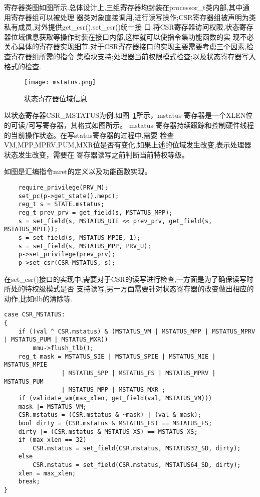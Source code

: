 寄存器类图如图所示.总体设计上,三组寄存器均封装在processor\_t类内部,其中通用寄存器组可以被处理
器类对象直接调用,进行读写操作;CSR寄存器组被声明为类私有成员,对外提供get\_csr(),set\_csr()统一接
口.将CSR寄存器访问权限,状态寄存器位域信息获取等操作封装在接口内部,这样就可以使指令集功能函数的实
现不必关心具体的寄存器实现细节.对于CSR寄存器接口的实现主要需要考虑三个因素,检查寄存器组所需的指令
集模块支持;处理器当前权限模式检查;以及状态寄存器写入格式的检查.
\begin{figure}[h]
    \centering
    \texttt{[image: mstatus.png]}
    \caption{状态寄存器位域信息}
    \label{fig:mstatus}
\end{figure}

以状态寄存器CSR\_MSTATUS为例.如图~\ref{fig:mstatus}所示，mstatus 寄存器是一个XLEN位的可读/可写寄存器，其格式如图所示。
mstatus 寄存器持续跟踪和控制硬件线程的当前操作状态。在写status寄存器的过程中,需要
检查VM,MPP,MPRV,PUM,MXR位是否有变化,如果上述的位域发生改变,表示处理器状态发生改变，需要在
寄存器读写之前判断当前特权等级。


如图是汇编指令mret的定义以及功能函数实现。
\begin{lstlisting}
    require_privilege(PRV_M);
    set_pc(p->get_state().mepc);
    reg_t s = STATE.mstatus;
    reg_t prev_prv = get_field(s, MSTATUS_MPP);
    s = set_field(s, MSTATUS_UIE << prev_prv, get_field(s, MSTATUS_MPIE));
    s = set_field(s, MSTATUS_MPIE, 1);
    s = set_field(s, MSTATUS_MPP, PRV_U);
    p->set_privilege(prev_prv);
    p->set_csr(CSR_MSTATUS, s);
\end{lstlisting}

在set\_csr()接口的实现中,需要对于CSR的读写进行检查,一方面是为了确保读写时所处的特权级模式是否
支持读写,另一方面需要针对状态寄存器的改变做出相应的动作,比如tlb的清除等.
\begin{lstlisting}
case CSR_MSTATUS:
{
    if ((val ^ CSR.mstatus) & (MSTATUS_VM | MSTATUS_MPP | MSTATUS_MPRV | MSTATUS_PUM | MSTATUS_MXR))
        mmu->flush_tlb();
    reg_t mask = MSTATUS_SIE | MSTATUS_SPIE | MSTATUS_MIE | MSTATUS_MPIE
                | MSTATUS_SPP | MSTATUS_FS | MSTATUS_MPRV | MSTATUS_PUM
                | MSTATUS_MPP | MSTATUS_MXR ;
    if (validate_vm(max_xlen, get_field(val, MSTATUS_VM)))
    mask |= MSTATUS_VM;
    CSR.mstatus = (CSR.mstatus & ~mask) | (val & mask);
    bool dirty = (CSR.mstatus & MSTATUS_FS) == MSTATUS_FS;
    dirty |= (CSR.mstatus & MSTATUS_XS) == MSTATUS_XS;
    if (max_xlen == 32)
        CSR.mstatus = set_field(CSR.mstatus, MSTATUS32_SD, dirty);
    else
        CSR.mstatus = set_field(CSR.mstatus, MSTATUS64_SD, dirty);
    xlen = max_xlen;
    break;
}
\end{lstlisting}

